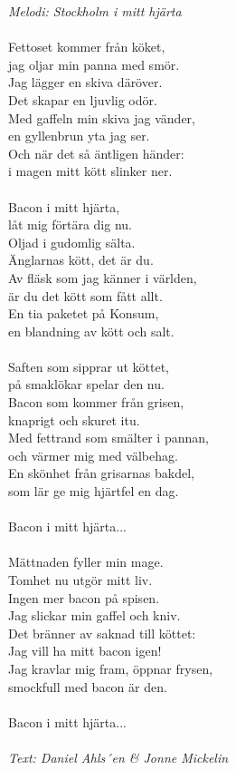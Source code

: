 {\footnotesize\textit{Melodi: Stockholm i mitt hjärta}}\\
\\
Fettoset kommer från köket,\\
jag oljar min panna med smör.\\
Jag lägger en skiva däröver.\\
Det skapar en ljuvlig odör.\\
Med gaffeln min skiva jag vänder,\\
en gyllenbrun yta jag ser.\\
Och när det så äntligen händer:\\
i magen mitt kött slinker ner.\\
\\
Bacon i mitt hjärta,\\
låt mig förtära dig nu.\\
Oljad i gudomlig sälta.\\
Änglarnas kött, det är du.\\
Av fläsk som jag känner i världen,\\
är du det kött som fått allt.\\
En tia paketet på Konsum,\\
en blandning av kött och salt.\\
\\
Saften som sipprar ut köttet,\\
på smaklökar spelar den nu.\\
Bacon som kommer från grisen,\\
knaprigt och skuret itu.\\
Med fettrand som smälter i pannan,\\
och värmer mig med välbehag.\\
En skönhet från grisarnas bakdel,\\
som lär ge mig hjärtfel en dag.\\
\\
Bacon i mitt hjärta...\\
\\
Mättnaden fyller min mage.\\
Tomhet nu utgör mitt liv.\\
Ingen mer bacon på spisen.\\
Jag slickar min gaffel och kniv.\\
Det bränner av saknad till köttet:\\
Jag vill ha mitt bacon igen!\\
Jag kravlar mig fram, öppnar frysen,\\
smockfull med bacon är den.\\
\\
Bacon i mitt hjärta...\\
\\
{\footnotesize\textit{Text: Daniel Ahls´{e}n \& Jonne Mickelin}}
